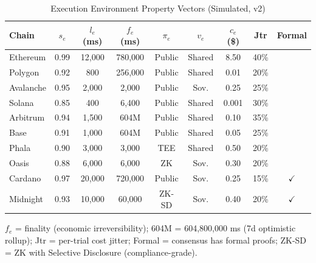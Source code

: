 \documentclass[conference, 10pt, twocolumn]{IEEEtran}
\begin{document}
\begin{table}[h]
\centering
\caption{Execution Environment Property Vectors (Simulated, v2)}
\label{tab:chains}
\small
\begin{tabular}{lcccccccc}
\toprule
\textbf{Chain} & $s_e$ & $l_e$ (ms) & $f_e$ (ms) & $\pi_e$ & $v_e$ & $c_e$ (\$) & Jtr & Formal \\
\midrule
Ethereum  & 0.99 & 12{,}000 & 780{,}000 & Public  & Shared & 8.50  & 40\% & \\
Polygon   & 0.92 & 800      & 256{,}000 & Public  & Shared & 0.01  & 20\% & \\
Avalanche & 0.95 & 2{,}000  & 2{,}000   & Public  & Sov.   & 0.25  & 25\% & \\
Solana    & 0.85 & 400      & 6{,}400   & Public  & Shared & 0.001 & 30\% & \\
Arbitrum  & 0.94 & 1{,}500  & 604M      & Public  & Shared & 0.10  & 35\% & \\
Base      & 0.91 & 1{,}000  & 604M      & Public  & Shared & 0.05  & 25\% & \\
Phala     & 0.90 & 3{,}000  & 3{,}000   & TEE     & Shared & 0.50  & 20\% & \\
Oasis     & 0.88 & 6{,}000  & 6{,}000   & ZK      & Sov.   & 0.30  & 20\% & \\
Cardano   & 0.97 & 20{,}000 & 720{,}000 & Public  & Sov.   & 0.25  & 15\% & $\checkmark$ \\
Midnight  & 0.93 & 10{,}000 & 60{,}000  & ZK-SD   & Sov.   & 0.40  & 20\% & $\checkmark$ \\
\bottomrule
\end{tabular}
\vspace{4pt}
\scriptsize
$f_e$ = finality (economic irreversibility); 604M = 604{,}800{,}000 ms (7d optimistic rollup);
Jtr = per-trial cost jitter; Formal = consensus has formal proofs;
ZK-SD = ZK with Selective Disclosure (compliance-grade).
\end{table}
\end{document}
